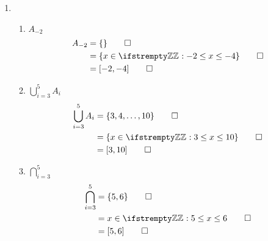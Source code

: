 \documentclass[12pt, a4paper]{article}
\begin{document}
\begin{enumerate}[Q\arabic*.]
    \pagebreak
  \item 
    \begin{enumerate}[(\alph*)]
      \item $A_{-2}$
        \begin{align*}
          A_{-2} &= \{\} \qed\\
                 &= \{x \in \ZZ : -2 \leq x \leq -4\}\qed\\
                 &= [-2, -4]\qed\\
        \end{align*}
      \item $\displaystyle \bigcup^5_{i=3}A_i$
        \begin{align*}
          \bigcup^5_{i=3}A_i &= \{3,4,\ldots,10\}\qed\\
                             &= \{x \in \ZZ : 3 \leq x \leq 10\}\qed\\
                             &= [3, 10] \qed\\
        \end{align*}
      \item $\displaystyle \bigcap^5_{i=3}$
        \begin{align*}
          \bigcap^5_{i=3} &= \{5, 6\} \qed \\
                          &= {x \in \ZZ : 5 \leq x \leq 6} \qed\\
                          &= [5, 6] \qed
        \end{align*}
    \end{enumerate}


\end{enumerate}
\end{document}
